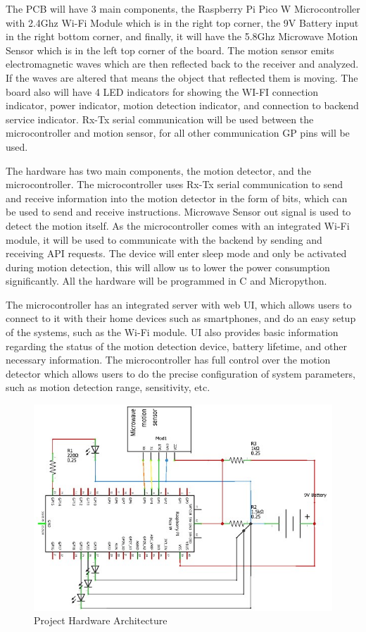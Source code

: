 The PCB will have 3 main components, the Raspberry Pi Pico W Microcontroller with
2.4Ghz Wi-Fi Module which is in the right top corner, the 9V Battery input in the
right bottom corner, and finally, it will have the 5.8Ghz Microwave Motion Sensor
which is in the left top corner of the board. %
The motion sensor emits electromagnetic waves which are then reflected back to the receiver and analyzed. %
If the waves are altered that means the object that reflected them is moving. %
The board also will have 4 LED indicators for showing the WI-FI connection indicator, power indicator,
motion detection indicator, and connection to backend service indicator. %
Rx-Tx serial communication will be used between the microcontroller and motion sensor,
for all other communication GP pins will be used. %

The hardware has two main components, the motion detector, and the microcontroller. %
The microcontroller uses Rx-Tx serial communication to send and receive information
into the motion detector in the form of bits, which can be used to send and receive
instructions. %
Microwave Sensor out signal is used to detect the motion itself. %
As the microcontroller comes with an integrated Wi-Fi module, it will be used to communicate with the backend by sending and receiving API requests.
The device will enter sleep mode and only be activated during motion detection,
this will allow us to lower the power consumption significantly. %
All the hardware will be programmed in C and Micropython. %

The microcontroller has an integrated server with web UI, which allows users
to connect to it with their home devices such as smartphones, and do an easy setup
of the systems, such as the Wi-Fi module. %
UI also provides basic information regarding the status of the motion detection device, battery lifetime, and other necessary
information. %
The microcontroller has full control over the motion detector which allows users to do the precise configuration of system parameters, such as motion
detection range, sensitivity, etc. %

\begin{figure}[htbp]
    \centering
    \includegraphics[width=1.5\linewidth, angle=-90]{images/hardwarearchitecture}
    \caption{Project Hardware Architecture}
    \label{fig:hardwareArchitecture}
\end{figure}

